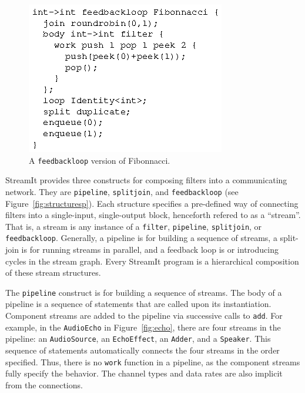 \begin{figure}
\centering
\includegraphics{fib-streamit.eps}
\caption{A \texttt{feedbackloop} version of Fibonnacci.}
\label{fig:feed}
\end{figure}

StreamIt provides three constructs for composing filters into a
communicating network. They are \texttt{pipeline}, \texttt{splitjoin}, and
\texttt{feedbackloop} (see Figure~\ref{fig:structuresp}).  Each
structure  specifies a pre-defined  way of  connecting filters  into a
single-input,  single-output   block,  henceforth  refered   to  as  a
``stream''.  That is, a stream is any instance of a \texttt{filter},
\texttt{pipeline}, \texttt{splitjoin}, or \texttt{feedbackloop}. 
Generally,  a  pipeline is  for  building  a  sequence of  streams,  a
split-join is for running streams  in parallel, and a feedback loop is
or introducing cycles in the  stream graph.  Every StreamIt program is
a hierarchical composition of these stream structures.

The \texttt{pipeline} construct is for building a sequence of
streams.  The body of a pipeline is a sequence of statements that are
called upon its instantiation.  Component streams are added to the
pipeline via successive calls to \texttt{add}.  For example, in the
\texttt{AudioEcho} in Figure~\ref{fig:echo}, there are four streams in
the pipeline: an \texttt{AudioSource}, an \texttt{EchoEffect}, an
\texttt{Adder}, and a \texttt{Speaker}.  This sequence of statements
automatically connects the four streams in the order specified.
Thus, there is no \texttt{work} function in a pipeline, as the
component streams fully specify the behavior.  The channel types and
data rates are also implicit from the connections.


